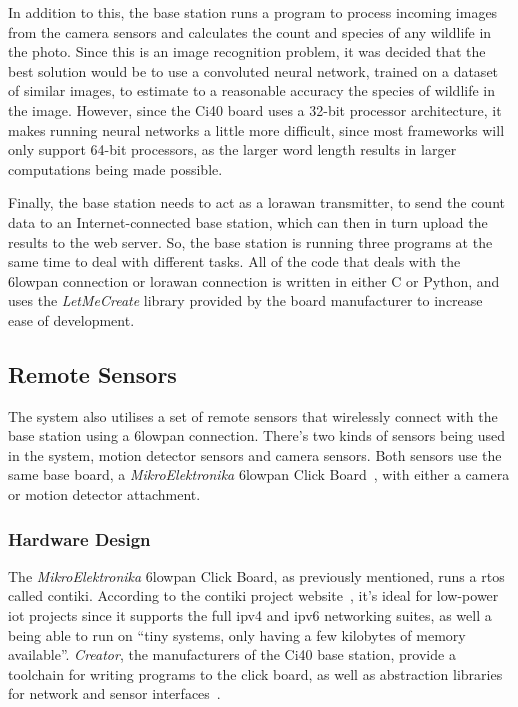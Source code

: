 In addition to this, the base station runs a program to process incoming
images from the camera sensors and calculates the count and species of any
wildlife in the photo. Since this is an image recognition problem, it was
decided that the best solution would be to use a convoluted neural network,
trained on a dataset of similar images, to estimate to a reasonable accuracy
the species of wildlife in the image. However, since the Ci40 board uses a
32-bit processor architecture, it makes running neural networks a little more
difficult, since most frameworks will only support 64-bit processors, as the
larger word length results in larger computations being made possible.

Finally, the base station needs to act as a \gls{lorawan} transmitter, to
send the count data to an Internet-connected base station, which can then in
turn upload the results to the web server. So, the base station is running
three programs at the same time to deal with different tasks. All of the code
that deals with the \gls{6lowpan} connection or \gls{lorawan} connection is
written in either C or Python, and uses the \textit{LetMeCreate} library
provided by the board manufacturer to increase ease of development.

\subsection{Remote Sensors}


The system also utilises a set of remote sensors that wirelessly connect with
the base station using a \gls{6lowpan} connection. There's two kinds of
sensors being used in the system, motion detector sensors and camera sensors.
Both sensors use the same base board, a \textit{MikroElektronika}
\gls{6lowpan} Click Board~\cite{mikroeclick}, with either a camera or motion
detector attachment.

\subsubsection{Hardware Design}

The \textit{MikroElektronika} \gls{6lowpan} Click Board, as previously
mentioned, runs a \acrfull{rtos} called \gls{contiki}. According to the
\gls{contiki} project website~\cite{contiki}, it's ideal for low-power
\acrshort{iot} projects since it supports the full \acrshort{ipv4} and
\acrshort{ipv6} networking suites, as well a being able to run on ``tiny
systems, only having a few kilobytes of memory available''. \textit{Creator},
the manufacturers of the Ci40 base station, provide a toolchain for writing
programs to the click board, as well as abstraction libraries for network and
sensor interfaces~\cite{letmecreate}.

